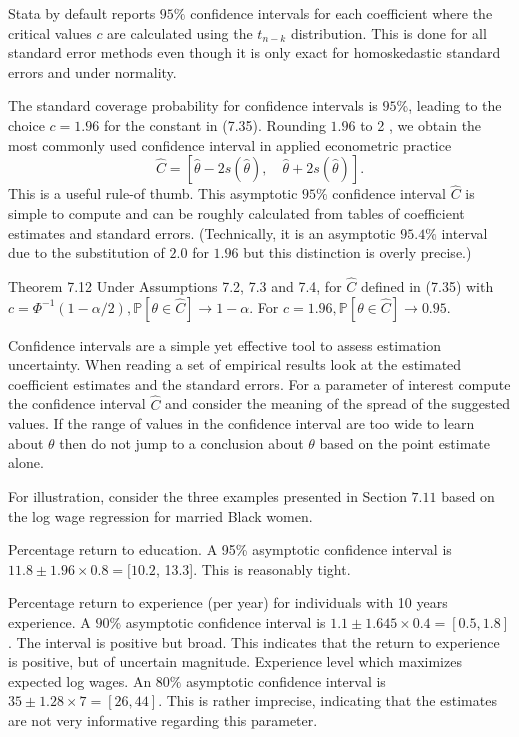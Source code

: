 \documentclass[10pt]{article}
\begin{document}
Stata by default reports $95 \%$ confidence intervals for each coefficient where the critical values $c$ are calculated using the $t_{n-k}$ distribution. This is done for all standard error methods even though it is only exact for homoskedastic standard errors and under normality.

The standard coverage probability for confidence intervals is $95 \%$, leading to the choice $c=1.96$ for the constant in (7.35). Rounding $1.96$ to 2 , we obtain the most commonly used confidence interval in applied econometric practice
$$
\widehat{C}=[\widehat{\theta}-2 s(\widehat{\theta}), \quad \widehat{\theta}+2 s(\widehat{\theta})] .
$$
This is a useful rule-of thumb. This asymptotic $95 \%$ confidence interval $\widehat{C}$ is simple to compute and can be roughly calculated from tables of coefficient estimates and standard errors. (Technically, it is an asymptotic $95.4 \%$ interval due to the substitution of $2.0$ for $1.96$ but this distinction is overly precise.)

Theorem 7.12 Under Assumptions 7.2, 7.3 and 7.4, for $\widehat{C}$ defined in (7.35) with $c=\Phi^{-1}(1-\alpha / 2), \mathbb{P}[\theta \in \widehat{C}] \rightarrow 1-\alpha$. For $c=1.96, \mathbb{P}[\theta \in \widehat{C}] \rightarrow 0.95$.

Confidence intervals are a simple yet effective tool to assess estimation uncertainty. When reading a set of empirical results look at the estimated coefficient estimates and the standard errors. For a parameter of interest compute the confidence interval $\widehat{C}$ and consider the meaning of the spread of the suggested values. If the range of values in the confidence interval are too wide to learn about $\theta$ then do not jump to a conclusion about $\theta$ based on the point estimate alone.

For illustration, consider the three examples presented in Section $7.11$ based on the log wage regression for married Black women.

Percentage return to education. A 95\% asymptotic confidence interval is $11.8 \pm 1.96 \times 0.8=[10.2$, 13.3]. This is reasonably tight.

Percentage return to experience (per year) for individuals with 10 years experience. A $90 \%$ asymptotic confidence interval is $1.1 \pm 1.645 \times 0.4=[0.5,1.8]$. The interval is positive but broad. This indicates that the return to experience is positive, but of uncertain magnitude. Experience level which maximizes expected log wages. An $80 \%$ asymptotic confidence interval is $35 \pm 1.28 \times 7=[26,44]$. This is rather imprecise, indicating that the estimates are not very informative regarding this parameter.
\end{document}
